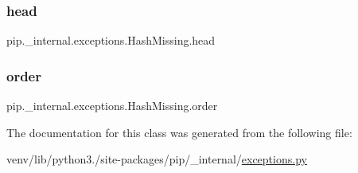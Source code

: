 \subsubsection{\texorpdfstring{head}{head}}
{\footnotesize\ttfamily pip.\+\_\+internal.\+exceptions.\+Hash\+Missing.\+head\hspace{0.3cm}{\ttfamily [static]}}

\mbox{\label{classpip_1_1__internal_1_1exceptions_1_1HashMissing_aa7fc90dfc984c50a21f80272a247191f}} 
\subsubsection{\texorpdfstring{order}{order}}
{\footnotesize\ttfamily pip.\+\_\+internal.\+exceptions.\+Hash\+Missing.\+order\hspace{0.3cm}{\ttfamily [static]}}



The documentation for this class was generated from the following file\+:\begin{DoxyCompactItemize}
\item 
venv/lib/python3./site-\/packages/pip/\+\_\+internal/\hyperlink{pip_2__internal_2exceptions_8py}{exceptions.\+py}\end{DoxyCompactItemize}
